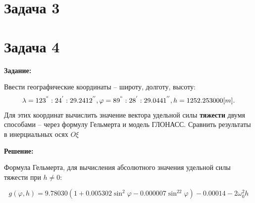 \documentclass[a4paper,14pt]{article}
\theoremstyle{plain} %
\theoremstyle{definition} %
\theoremstyle{remark} %
\begin{document}
{\section{Задача 3}
\section{Задача 4}
\textbf{Задание:}

Ввести географические координаты -- широту, долготу, высоту:
\[
    \lambda=123^{\degree}:24^{'}:29.2412^{''}, \varphi=89^{\degree}:28^{'}:29.0441^{''}, h=1252.253000[m].
\]
Для этих координат вычислить значение вектора удельной силы
\textbf{тяжести} двумя способами -- через формулу Гельмерта и модель ГЛОНАСС.
Сравнить результаты в инерциальных осях $O\xi$

\textbf{Решение:}

Формула Гельмерта, для вычисления абсолютного значения удельной силы тяжести при $h\neq0$:

\[
    g(\varphi,h)=9.78030(1+0.005302\sin^2\varphi-0.000007\sin^22\varphi)-0.00014-2\omega^2_0h
\]

}
\end{document}
